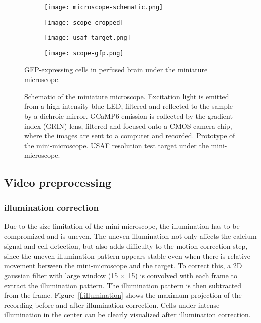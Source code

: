 \begin{figure}[h]
    \begin{subfigure}[t]{.55\textwidth}
        \centering
        \texttt{[image: microscope-schematic.png]}
        \caption{\label{f.scope-schema}}
    \end{subfigure}
    \begin{subfigure}[t]{.45\textwidth}
        \centering
        \texttt{[image: scope-cropped]}
        \caption{\label{f.scope}}
    \end{subfigure}
    \begin{subfigure}[t]{.5\textwidth}
        \centering
        \texttt{[image: usaf-target.png]}
        \caption{\label{f.usaf}}
    \end{subfigure}
    \begin{subfigure}[t]{.5\textwidth}
        \centering
        \texttt{[image: scope-gfp.png]}
        \caption{\label{f.scope-gfp}}
    \end{subfigure}
    \caption{ Schematic of the miniature microscope. Excitation light is emitted from a high-intensity blue LED, filtered and reflected to the sample by a dichroic mirror. GCaMP6 emission is collected by the gradient-index (GRIN) lens, filtered and focused onto a CMOS camera chip, where the images are sent to a computer and recorded. 
              Prototype of the mini-microscope.
              USAF resolution test target under the mini-microscope.}
              GFP-expressing cells in perfused brain under the miniature microscope.
\end{figure}

\subsection{Video preprocessing}
\subsubsection{illumination correction}
Due to the size limitation of the mini-microscope, the illumination has to be compromized and is uneven. The uneven illumination not only affects the calcium signal and cell detection, but also adds difficulty to the motion correction step, since the uneven illumination pattern appears stable even when there is relative movement between the mini-microscope and the target. To correct this, a 2D gaussian filter with large window (15 $\times$ 15) is convolved with each frame to extract the illumination pattern. The illumination pattern is then subtracted from the frame. Figure~\ref{f.illumination} shows the maximum projection of the recording before and after illumination correction. Cells under intense illumination in the center can be clearly visualized after illumination correction.

